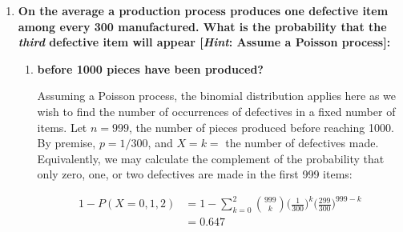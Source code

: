 \documentclass[10pt, oneside]{article}
\begin{document}
\begin{enumerate}[label=9.\arabic*]
\begin{enumerate}
	\[ P(T > 3) = \int^{+\infty}_3 \frac{2}{7} e^{-2t/7} \ dt \approx \boxed{0.424} \]
	
	\item  \begin{tcolorbox}[
	  colback=Cerulean!5!white,
	  colframe=Cerulean!75!black]
	\textbf{the time from one accident to the third accident will be more than a week?}
	\end{tcolorbox}
	
	Here we use a Gamma distribution to model the scenario, as it tells us the probability of the $r$-th occurrence of an event happening in a given period of time. Framing the scenario as in the previous case where one accident happening is at $t = 0$, we calculate $P(T > 7)$ for $r = 2$, since the \textit{second} accident happening \textit{after} the first is the \textit{third overall}:
	
	\[ P(T > 7) = \int^{+\infty}_7 \frac{2/7}{\Gamma(2)} \bigg( \frac{2}{7} t \bigg) e^{-2t/7} \ dt \approx \boxed{0.406} \]
	\end{enumerate}

\item  \begin{tcolorbox}[
  colback=Cerulean!5!white,
  colframe=Cerulean!75!black]
\textbf{On the average a production process produces one defective item among every 300 manufactured. What is the probability that the \textit{third} defective item will appear [\textit{Hint}: Assume a Poisson process]:}
\end{tcolorbox}

	\begin{enumerate}
	\item  \begin{tcolorbox}[
	  colback=Cerulean!5!white,
	  colframe=Cerulean!75!black]
	\textbf{before 1000 pieces have been produced?}
	\end{tcolorbox}
	
	Assuming a Poisson process, the binomial distribution applies here as we wish to find the number of occurrences of defectives in a fixed number of items. Let $n = 999$, the number of pieces produced before reaching 1000. By premise, $p = 1/300$, and $X = k = $ the number of defectives made. Equivalently, we may calculate the complement of the probability that only zero, one, or two defectives are made in the first 999 items:
	
	\begin{align*}
	1 - P(X = 0,1,2) &= 1 - \sum^2_{k=0} \binom{999}{k} \bigg( \frac{1}{300} \bigg)^k \bigg( \frac{299}{300} \bigg)^{999-k} \\
	&= \boxed{0.647}
	\end{align*}
	

\end{enumerate}
\end{enumerate}
\end{document}

